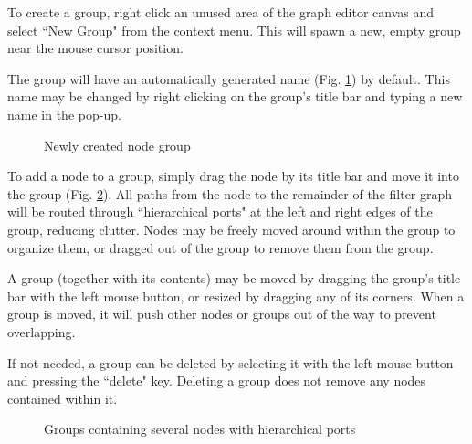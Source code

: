 To create a group, right click an unused area of the graph editor canvas and select ``New Group" from the context menu.
This will spawn a new, empty group near the mouse cursor position.

The group will have an automatically generated name (Fig. \ref{graph-editor-group1}) by default. This name may be
changed by right clicking on the group's title bar and typing a new name in the pop-up.

\begin{figure}[H]
\centering
{}
\caption{Newly created node group}
\label{graph-editor-group1}
\end{figure}

To add a node to a group, simply drag the node by its title bar and move it into the group (Fig.
\ref{graph-editor-group2}). All paths from the node to the remainder of the filter graph will be routed through
``hierarchical ports" at the left and right edges of the group, reducing clutter. Nodes may be freely moved around
within the group to organize them, or dragged out of the group to remove them from the group.

A group (together with its contents) may be moved by dragging the group's title bar with the left mouse button, or
resized by dragging any of its corners. When a group is moved, it will push other nodes or groups out of the way to
prevent overlapping.

If not needed, a group can be deleted by selecting it with the left mouse button and pressing the ``delete" key.
Deleting a group does not remove any nodes contained within it.

\begin{figure}[H]
\centering
{}
\caption{Groups containing several nodes with hierarchical ports}
\label{graph-editor-group2}
\end{figure}
